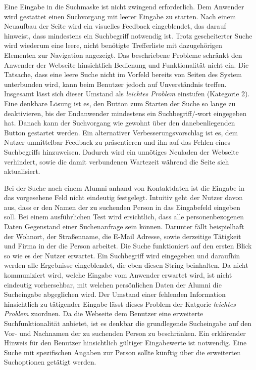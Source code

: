 {
	Eine Eingabe in die Suchmaske ist nicht zwingend erforderlich. Dem Anwender wird gestattet einen Suchvorgang mit leerer Eingabe zu starten. Nach einem Neuaufbau der Seite wird ein visuelles Feedback eingeblendet, das darauf hinweist, dass mindestens ein Suchbegriff notwendig ist. Trotz gescheiterter Suche wird wiederum eine leere, nicht benötigte Trefferliste mit dazugehörigen Elementen zur Navigation angezeigt.
}
{
	Das beschriebene Probleme schränkt den Anwender der Webseite hinsichtlich Bedienung und Funktionalität nicht ein. Die Tatsache, dass eine leere Suche nicht im Vorfeld bereits von Seiten des System unterbunden wird, kann beim Benutzer jedoch auf Unverständnis treffen. Insgesamt lässt sich dieser Umstand als \emph{leichtes Problem} einstufen (Kategorie 2).
}
{
	Eine denkbare Lösung ist es, den Button zum Starten der Suche so lange zu deaktivieren, bis der Endanwender mindestens ein Suchbegriff/-wort eingegeben hat. Danach kann der Suchvorgang wie gewohnt über den danebenliegenden Button gestartet werden. Ein alternativer Verbesserungsvorschlag ist es, dem Nutzer unmittelbar Feedback zu präsentieren und ihn auf das Fehlen eines Suchbegriffs hinzuweisen. Dadurch wird ein unnötiges Neuladen der Webseite verhindert, sowie die damit verbundenen Wartezeit während die Seite sich aktualisiert.
}

{
	Bei der Suche nach einem Alumni anhand von Kontaktdaten ist die Eingabe in das vorgesehene Feld nicht eindeutig festgelegt. Intuitiv geht der Nutzer davon aus, dass er den Namen der zu suchenden Person in das Eingabefeld eingeben soll. Bei einem ausführlichen Test wird ersichtlich, dass alle personenbezogenen Daten Gegenstand einer Suchenanfrage sein können. Darunter fällt beispielhaft der Wohnort, der Straßenname, die E-Mail Adresse, sowie derzeitige Tätigkeit und Firma in der die Person arbeitet.
}
{
	Die Suche funktioniert auf den ersten Blick so wie es der Nutzer erwartet. Ein Suchbegriff wird eingegeben und daraufhin werden alle Ergebnisse eingeblendet, die eben diesen String  beinhalten. Da nicht kommuniziert wird, welche Eingabe vom Anwender erwartet wird, ist nicht eindeutig vorhersehbar, mit welchen persönlichen Daten der Alumni die Sucheingabe abgeglichen wird. Der Umstand einer fehlenden Information hinsichtlich zu tätigender Eingabe lässt dieses Problem der Katgorie \emph{leichtes Problem} zuordnen.
}
{
	Da die Webseite dem Benutzer eine erweiterte Suchfunktionalität anbietet, ist es denkbar die grundlegende Sucheingabe auf den Vor- und Nachnamen der zu suchenden Person zu beschränken. Ein erklärender Hinweis für den Benutzer hinsichtlich gültiger Eingabewerte ist notwendig. Eine Suche mit spezifischen Angaben zur Person sollte künftig über die erweiterten Suchoptionen getätigt werden.
}

